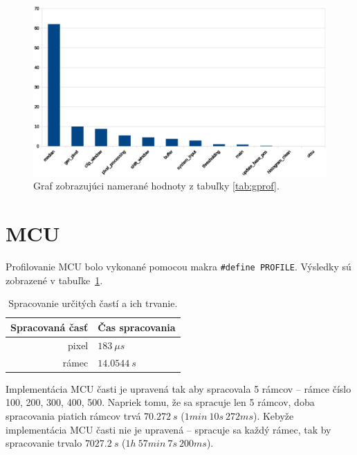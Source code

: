 \documentclass[11pt,a4paper]{article}
\begin{document}
\begin{figure}[H]
    \centering
    \includegraphics[scale=0.6]{graph.eps}
    \caption{Graf zobrazujúci namerané hodnoty z tabuľky \ref{tab:gprof}.}
    \label{fig:graf}
\end{figure}

\newpage
\section{MCU}

Profilovanie MCU bolo vykonané pomocou makra \texttt{\#define PROFILE}. Výsledky sú zobrazené v tabuľke~\ref{tab:process}.

\begin{table}[H]
  \begin{center}
    \begin{tabular}{r|l}
        \multicolumn{1}{c|}{\textbf{Spracovaná časť}} & \multicolumn{1}{c}{\textbf{Čas spracovania}}\\
        \hline
        pixel & $183 \ \mu s$\\
        rámec & $14.0544 \ s$\\
    \end{tabular}
    \caption{Spracovanie určitých častí a ich trvanie.}
    \label{tab:process}
  \end{center}
\end{table}

Implementácia MCU časti je upravená tak aby spracovala 5 rámcov -- rámce číslo 100, 200, 300, 400, 500. Napriek tomu, že sa spracuje len 5 rámcov, doba spracovania piatich rámcov trvá $70.272 \ s$ ($1min \ 10s \ 272ms$). Kebyže implementácia MCU časti nie je upravená -- spracuje sa každý rámec, tak by spracovanie trvalo $7027.2 \ s$ ($1h \ 57min \ 7s \ 200ms$).
\end{document}
